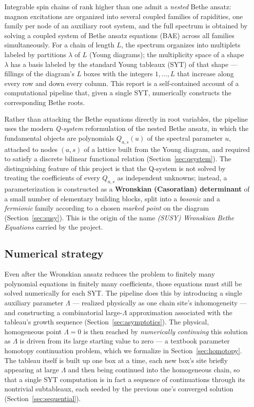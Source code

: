 \documentclass[11pt]{article}
\begin{document}
Integrable spin chains of rank higher than one admit a \emph{nested}
Bethe ansatz: magnon excitations are organized into several coupled
families of rapidities, one family per node of an auxiliary root system,
and the full spectrum is obtained by solving a coupled system of Bethe
ansatz equations (BAE) across all families simultaneously. For a chain of
length $L$, the spectrum organizes into multiplets labeled by partitions
$\lambda$ of $L$ (Young diagrams); the multiplicity space of a shape $\lambda$ has a basis
labeled by the standard Young tableaux (SYT) of that shape --- fillings of the diagram's $L$ boxes with the integers
$1,\dots,L$ that increase along every row and down every column. This
report is a self-contained account of a computational pipeline that,
given a single SYT, numerically constructs the corresponding Bethe roots.

Rather than attacking the Bethe equations directly in root variables, the
pipeline uses the modern \emph{Q-system} reformulation of the nested Bethe
ansatz, in which the fundamental objects are polynomials $Q_{a,s}(u)$ of
the spectral parameter $u$, attached to nodes $(a,s)$ of a lattice built
from the Young diagram, and required to satisfy a discrete bilinear
functional relation (Section~\ref{sec:qsystem}). The distinguishing
feature of this project is that the Q-system is not solved by treating
the coefficients of every $Q_{a,s}$ as independent unknowns; instead, a
parameterization is constructed as a \textbf{Wronskian
(Casoratian) determinant} of a small number of elementary building
blocks, split into a \emph{bosonic} and a \emph{fermionic} family
according to a chosen \emph{marked point} on the diagram
(Section~\ref{sec:susy}). This is the origin of the name
\emph{(SUSY) Wronskian Bethe Equations} carried by the project.

\subsection{Numerical strategy}

Even after the Wronskian ansatz reduces the problem to finitely many
polynomial equations in finitely many coefficients, those equations must
still be solved numerically for each SYT. The pipeline does this by
introducing a single auxiliary parameter $\Lambda$ --- realized physically
as one chain site's inhomogeneity --- and constructing a combinatorial large-$\Lambda$ approximation associated
with the tableau's growth sequence (Section~\ref{sec:asymptotics}). The physical, homogeneous
point $\Lambda=0$ is then reached by \emph{numerically continuing} this
solution as $\Lambda$ is driven from its large starting value to zero ---
a textbook parameter homotopy continuation problem, which we formalize in
Section~\ref{sec:homotopy}. The tableau itself is built up one box at a
time, each new box's site briefly appearing at large $\Lambda$ and then
being continued into the homogeneous chain, so that a single SYT
computation is in fact a sequence of continuations through its nontrivial subtableaux,
each seeded by the previous one's converged solution
(Section~\ref{sec:sequential}).
\end{document}
